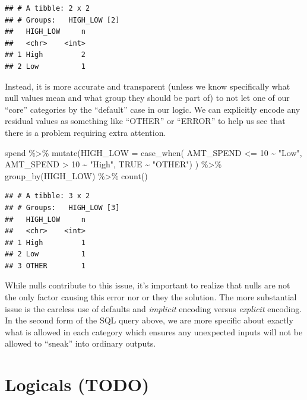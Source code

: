 \documentclass[
]{krantz}
\makeatletter
\newenvironment{Shaded}{\begin{snugshade}}{\end{snugshade}}
\newcommand{\AttributeTok}[1]{\textcolor[rgb]{0.61,0.61,0.61}{#1}}
\newcommand{\ConstantTok}[1]{\textcolor[rgb]{0,0,0}{#1}}
\newcommand{\DecValTok}[1]{\textcolor[rgb]{0.06,0.06,0.06}{#1}}
\newcommand{\FunctionTok}[1]{\textcolor[rgb]{0,0,0}{#1}}
\newcommand{\NormalTok}[1]{#1}
\newcommand{\SpecialCharTok}[1]{\textcolor[rgb]{0,0,0}{#1}}
\newcommand{\StringTok}[1]{\textcolor[rgb]{0.5,0.5,0.5}{#1}}
\newenvironment{kframe}{%
\medskip{}
\setlength{\fboxsep}{.8em}
 \def\at@end@of@kframe{}%
 \ifinner\ifhmode%
  \def\at@end@of@kframe{\end{minipage}}%
  \begin{minipage}{\columnwidth}%
 \fi\fi%
 \def\FrameCommand##1{\hskip\@totalleftmargin \hskip-\fboxsep
 \colorbox{shadecolor}{##1}\hskip-\fboxsep
     \hskip-\linewidth \hskip-\@totalleftmargin \hskip\columnwidth}%
 \MakeFramed {\advance\hsize-\width
   \@totalleftmargin\z@ \linewidth\hsize
   \@setminipage}}%
 {\par\unskip\endMakeFramed%
 \at@end@of@kframe}
\renewenvironment{Shaded}{\begin{kframe}}{\end{kframe}}
\makeatother
\begin{document}
\begin{verbatim}
## # A tibble: 2 x 2
## # Groups:   HIGH_LOW [2]
##   HIGH_LOW     n
##   <chr>    <int>
## 1 High         2
## 2 Low          1
\end{verbatim}

Instead, it is more accurate and transparent (unless we know specifically what null values mean and what group they should be part of) to not let one of our ``core'' categories by the ``default'' case in our logic.
We can explicitly encode any residual values as something like ``OTHER'' or ``ERROR'' to help us see that there is a problem requiring extra attention.

\begin{Shaded}
\begin{Highlighting}[]
\NormalTok{spend }\SpecialCharTok{\%\textgreater{}\%}
  \FunctionTok{mutate}\NormalTok{(}\AttributeTok{HIGH\_LOW =} \FunctionTok{case\_when}\NormalTok{(}
\NormalTok{    AMT\_SPEND }\SpecialCharTok{\textless{}=} \DecValTok{10} \SpecialCharTok{\textasciitilde{}} \StringTok{"Low"}\NormalTok{, }
\NormalTok{    AMT\_SPEND }\SpecialCharTok{\textgreater{}} \DecValTok{10} \SpecialCharTok{\textasciitilde{}} \StringTok{"High"}\NormalTok{,}
    \ConstantTok{TRUE} \SpecialCharTok{\textasciitilde{}} \StringTok{"OTHER"}\NormalTok{)}
\NormalTok{    ) }\SpecialCharTok{\%\textgreater{}\%}
  \FunctionTok{group\_by}\NormalTok{(HIGH\_LOW) }\SpecialCharTok{\%\textgreater{}\%} 
  \FunctionTok{count}\NormalTok{()}
\end{Highlighting}
\end{Shaded}

\begin{verbatim}
## # A tibble: 3 x 2
## # Groups:   HIGH_LOW [3]
##   HIGH_LOW     n
##   <chr>    <int>
## 1 High         1
## 2 Low          1
## 3 OTHER        1
\end{verbatim}

While nulls contribute to this issue, it's important to realize that nulls are not the only factor causing this error nor or they the solution.
The more substantial issue is the careless use of defaults and \emph{implicit} encoding versus \emph{explicit} encoding.
In the second form of the SQL query above, we are more specific about exactly what is allowed in each category which ensures any unexpected inputs will not be allowed to ``sneak'' into ordinary outputs.

\hypertarget{logicals-todo}{%
\section{Logicals (TODO)}\label{logicals-todo}}
\end{document}

